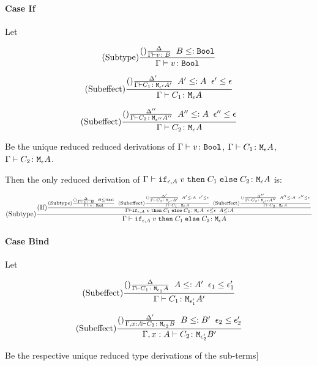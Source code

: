 {    \paragraph{Case If}
    Let

    \begin{equation}
        \deltavrule{\G}{v}{B}{\B}
    \end{equation}

    \begin{equation}
        \deltacruleprime{\G}{C_1}{\e'}{A'}{\e}{A}
    \end{equation}

    \begin{equation}
        \deltacruleprimeprime{\G}{C_2}{\e''}{A''}{\e}{A}
    \end{equation}

    Be the unique reduced reduced derivations of $\gtyperelation{v}{\B}$, $\gtyperelation{C_1}{\mea}$, $\gtyperelation{C_2}{\mea}$.

    Then the only reduced derivation of $\gtyperelation{\ifthenelse{\e}{A}{v}{C_1}{C_2}}{\mea}$ is:

    \begin{equation}
        \treerule{Subtype}{
            \treerule{If}{
                \deltavrule{\G}{v}{B}{\B}
                \s\s
                \deltacruleprime{\G}{C_1}{\e'}{A'}{\e}{A}
                \s\s
                \deltacruleprimeprime{\G}{C_2}{\e''}{A''}{\e}{A}
            }{\gtyperelation{\ifthenelse{\e}{A}{v}{C_1}{C_2}}{\mea}\s\s \e\subeffect \e\s\s A \subtype A}
        }{\gtyperelation{\ifthenelse{\e}{A}{v}{C_1}{C_2}}{\mea}}
    \end{equation}

    \paragraph{Case Bind}

    Let 

    \begin{equation}
        \deltacrule{\G}{C_1}{\e_1}{A}{\e_1'}{A'}
    \end{equation}

    \begin{equation}
        \deltacruleprime{\G, x:A}{C_2}{\e_2}{B}{\e_2'}{B'}
    \end{equation}

    Be the respective unique reduced type derivations of the sub-terms]

}
